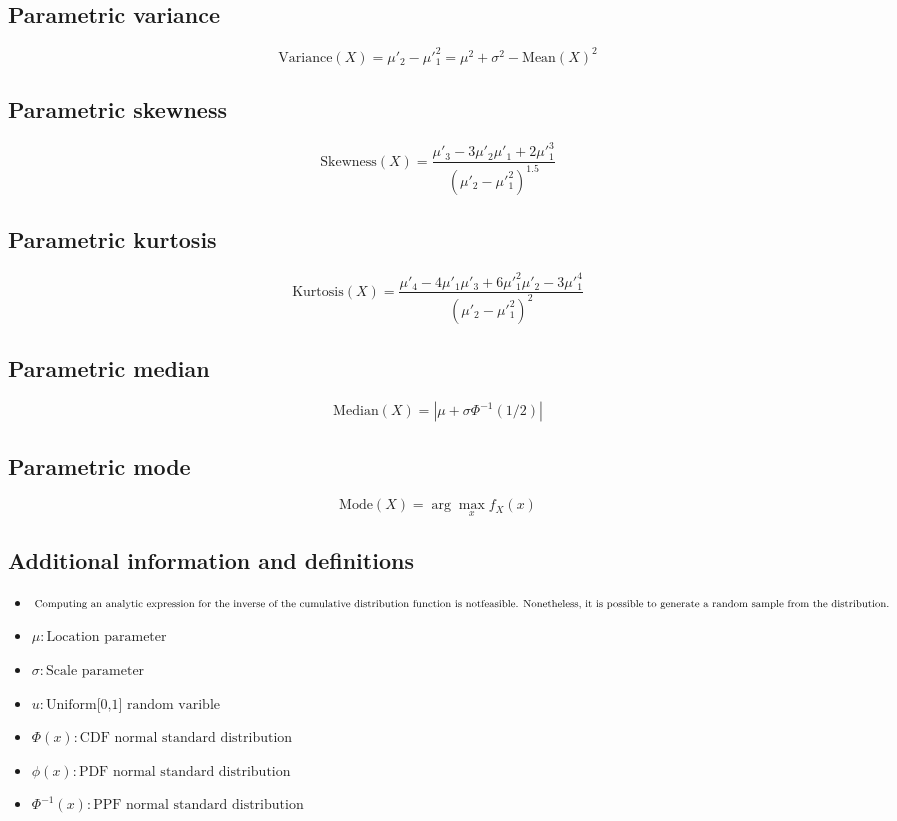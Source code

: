 \documentclass{article}
\begin{document}
\subsection{Parametric variance}
\begin{equation*} \mathrm{Variance}(X)=\mu'_{2}-\mu'^{2}_{1}=\mu^2+\sigma^2-\mathrm{Mean}(X)^{2} \end{equation*}
\subsection{Parametric skewness}
\begin{equation*} \mathrm{Skewness}(X)=\frac{\mu'_{3}-3\mu'_{2}\mu'_{1}+2\mu'^{3}_{1}}{(\mu'_{2}-\mu'^{2}_{1})^{1.5}} \end{equation*}
\subsection{Parametric kurtosis}
\begin{equation*} \mathrm{Kurtosis}(X)=\frac{\mu'_{4}-4\mu'_{1}\mu'_{3}+6\mu'^{2}_{1}\mu'_{2}-3\mu'^{4}_{1}}{(\mu'_{2}-\mu'^{2}_{1})^{2}} \end{equation*}
\subsection{Parametric median}
\begin{equation*} \mathrm{Median}(X)=\left|\mu+\sigma\Phi^{-1}\left(1/2\right)\right| \end{equation*}
\subsection{Parametric mode}
\begin{equation*} \mathrm{Mode}(X)=\arg\max_{x}f_{X}\left(x\right) \end{equation*}
\subsection{Additional information and definitions}
\begin{itemize}
    \item $ \text{Computing an analytic expression for the inverse of the cumulative distribution function is not} \\ \text{feasible. Nonetheless, it is possible to generate a random sample from the distribution.} $
    \item $ \mu:\text{Location parameter} $
    \item $ \sigma:\text{Scale parameter} $
    \item $ u:\text{Uniform[0,1] random varible} $
    \item $ \Phi\left(x\right):\text{CDF normal standard distribution} $
    \item $ \phi\left(x\right):\text{PDF normal standard distribution} $
    \item $ \Phi^{-1}\left(x\right):\text{PPF normal standard distribution} $
\end{itemize}
\end{document}
